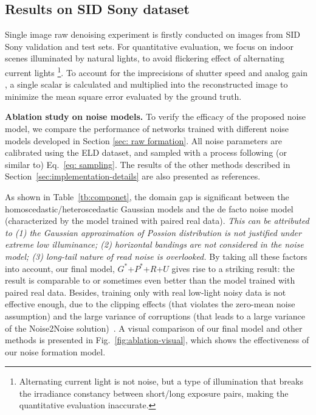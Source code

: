 \documentclass[10pt,twocolumn,letterpaper]{article}
\begin{document}
\subsection{Results on SID Sony dataset}
Single image raw denoising experiment is firstly conducted on images from SID Sony validation and test sets.
For quantitative evaluation, we focus on indoor scenes illuminated by natural lights, to avoid flickering effect of alternating current lights \cite{Abdelhamed_2018_CVPR}
\footnote{Alternating current light is not noise, but a type of
illumination that breaks the irradiance constancy between short/long exposure pairs, making the quantitative evaluation inaccurate.}. To account for the imprecisions of shutter speed and analog gain \cite{Abdelhamed_2018_CVPR}, a single scalar
is calculated and multiplied into the reconstructed image to
minimize the mean square error evaluated by the ground
truth.


\vspace{3pt}
\noindent\textbf{Ablation study on noise models.}
To verify the efficacy of the proposed noise model, we compare the performance of networks trained with different noise models developed in Section \ref{sec: raw formation}.
All noise parameters are calibrated using the ELD
dataset, and sampled with a process following (or similar to) Eq.~\eqref{eq: sampling}.
The results of the other methods described in Section~\ref{sec:implementation-details} are also presented as references. 



As shown in Table~\ref{tb:componet}, the domain gap is significant between the
homoscedastic/heteroscedastic Gaussian models and the de facto noise model
(characterized by the model trained with paired real data). \textit{This can be
attributed to (1) the Gaussian approximation of Possion distribution is not
justified under extreme low illuminance; (2) horizontal bandings are not
considered in the noise model; (3) long-tail nature of read noise is overlooked. }
By taking all these factors into account, our final model, \ie $G^*$+$P^*$+$R$+$U$ gives
rise to a striking result: the result is comparable to or sometimes even better
than the model trained with paired real data. 
Besides, training only with real low-light noisy data is not effective enough,
due to the clipping effects (that violates the zero-mean noise assumption) and
the large variance of corruptions (that leads to a large variance of the
Noise2Noise solution)~\cite{pmlr-v80-lehtinen18a}. A visual comparison of our final model and other methods is presented in Fig.~\ref{fig:ablation-visual}, which shows the effectiveness of our noise formation model.
\end{document}
